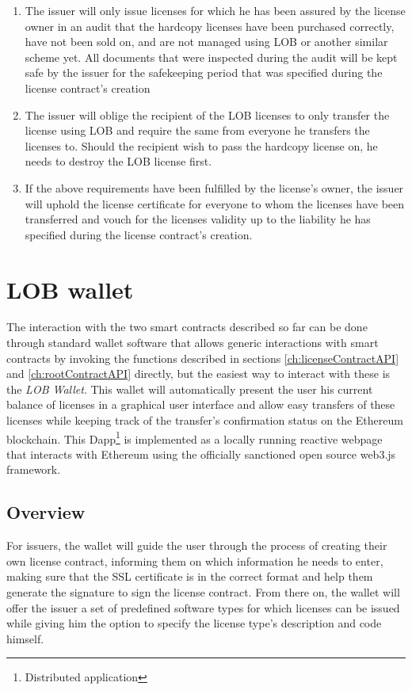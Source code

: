 \documentclass[a4paper]{article}
\begin{document}
\begin{enumerate}
  \item The issuer will only issue licenses for which he has been assured by the license owner in an audit that the hardcopy licenses have been purchased correctly, have not been sold on, and are not managed using LOB or another similar scheme yet. All documents that were inspected during the audit will be kept safe by the issuer for the safekeeping period that was specified during the license contract's creation
  \item The issuer will oblige the recipient of the LOB licenses to only transfer the license using LOB and require the same from everyone he transfers the licenses to. Should the recipient wish to pass the hardcopy license on, he needs to destroy the LOB license first.
  \item If the above requirements have been fulfilled by the license's owner, the issuer will uphold the license certificate for everyone to whom the licenses have been transferred and vouch for the licenses validity up to the liability he has specified during the license contract's creation.
\end{enumerate}



\section{LOB wallet}
\label{ch:wallet}

The interaction with the two smart contracts described so far can be done through standard wallet software that allows generic interactions with smart contracts by invoking the functions described in sections \ref{ch:licenseContractAPI} and \ref{ch:rootContractAPI} directly, but the easiest way to interact with these is the \emph{LOB Wallet}. This wallet will automatically present the user his current balance of licenses in a graphical user interface and allow easy transfers of these licenses while keeping track of the transfer's confirmation status on the Ethereum blockchain. This Dapp\footnote{Distributed application} is implemented as a locally running reactive webpage that interacts with Ethereum using the officially sanctioned open source web3.js framework.

\subsection{Overview}

For issuers, the wallet will guide the user through the process of creating their own license contract, informing them on which information he needs to enter, making sure that the SSL certificate is in the correct format and help them generate the signature to sign the license contract. From there on, the wallet will offer the issuer a set of predefined software types for which licenses can be issued while giving him the option to specify the license type's description and code himself.
\end{document}
